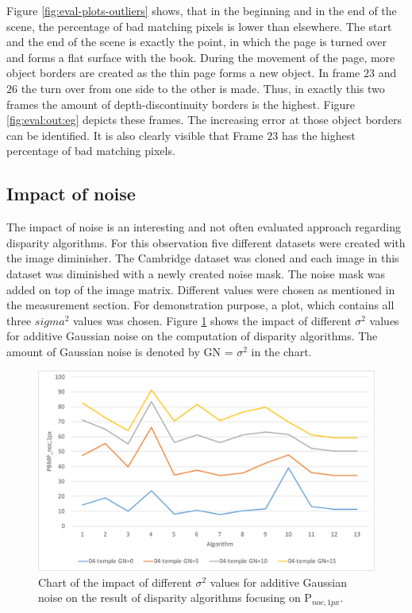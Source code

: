 \noindent Figure \ref{fig:eval-plots-outliers} shows, that in the beginning and in the end of the scene, the percentage of bad matching pixels is lower than elsewhere.
The start and the end of the scene is exactly the point, in which the page is turned over and forms a flat surface with the book.
During the movement of the page, more object borders are created as the thin page forms a new object.
In frame $23$ and $26$ the turn over from one side to the other is made.
Thus, in exactly this two frames the amount of depth-discontinuity borders is the highest.
Figure \ref{fig:eval:out:eg} depicts these frames.
The increasing error at those object borders can be identified.
It is also clearly visible that Frame $23$ has the highest percentage  of bad matching pixels.

\subsection{Impact of noise}

The impact of noise is an interesting and not often evaluated approach regarding disparity algorithms.
For this observation five different datasets were created with the image diminisher.
The Cambridge dataset was cloned and each image in this dataset was diminished with a newly created noise mask.
The noise mask was added on top of the image matrix.
Different values were chosen as mentioned in the measurement section.
For demonstration purpose, a plot, which contains all three $sigma^2$ values was chosen.
Figure \ref{fig:eval-plots-gn-overview} shows the impact of different $\sigma^2$ values for additive Gaussian noise on the computation of disparity algorithms.
The amount of Gaussian noise is denoted by GN = $\sigma^2$ in the chart.

\begin{figure}[h!]
\centering
\includegraphics[width=1.0\textwidth]{src/images/evaluation/plots/04-temple-gn-overview.pdf}
\caption[Chart of the impact of Gaussian noise]{Chart of the impact of different $\sigma^2$ values for additive Gaussian noise on the result of disparity algorithms focusing on P$_{noc,1px}$.}
\label{fig:eval-plots-gn-overview}
\end{figure}

